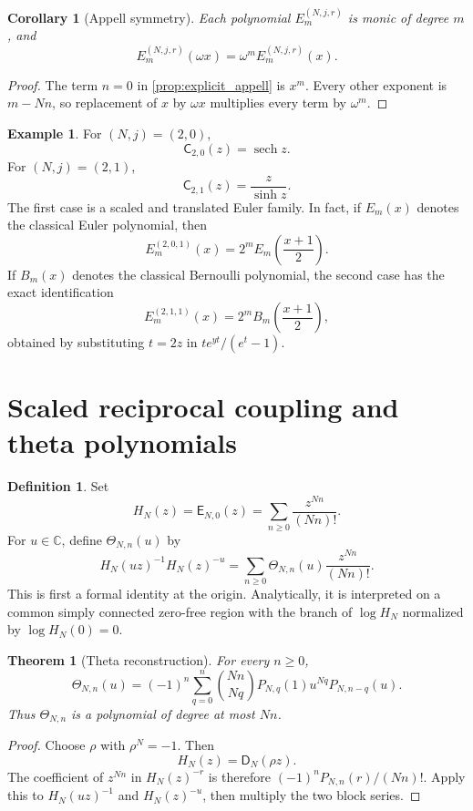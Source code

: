\documentclass[11pt]{article}
\newtheorem{theorem}{Theorem}[section]
\newtheorem{corollary}[corollary]{Corollary}
\theoremstyle{definition}
\newtheorem{definition}[definition]{Definition}
\newtheorem{example}[example]{Example}
\theoremstyle{remark}
\newcommand{\CC}{\mathbb C}
\newcommand{\Dfun}{\mathsf D}
\newcommand{\Efun}{\mathsf E}
\newcommand{\Cfun}{\mathsf C}
\newcommand{\Thetafun}{\mathsf\Theta}
\newcommand{\sech}{\operatorname{sech}}
\begin{document}
\begin{corollary}[Appell symmetry]\label{cor:appell_symmetry}
Each polynomial $E_m^{(N,j,r)}$ is monic of degree $m$, and
\[
E_m^{(N,j,r)}(\omega x)
=
\omega^mE_m^{(N,j,r)}(x).
\]
\end{corollary}

\begin{proof}
The term $n=0$ in \cref{prop:explicit_appell} is $x^m$.  Every other exponent is $m-Nn$, so replacement of $x$ by $\omega x$ multiplies every term by $\omega^m$.
\end{proof}

\begin{example}\label{ex:euler_boundaries}
For $(N,j)=(2,0)$,
\[
\Cfun_{2,0}(z)=\sech z.
\]
For $(N,j)=(2,1)$,
\[
\Cfun_{2,1}(z)=\frac z{\sinh z}.
\]
The first case is a scaled and translated Euler family.  In fact, if $E_m(x)$ denotes the classical Euler polynomial, then
\[
E_m^{(2,0,1)}(x)
=
2^mE_m\left(\frac{x+1}{2}\right).
\]
If $B_m(x)$ denotes the classical Bernoulli polynomial, the second case has
the exact identification
\[
E_m^{(2,1,1)}(x)
=
2^mB_m\left(\frac{x+1}{2}\right),
\]
obtained by substituting $t=2z$ in
$t e^{yt}/(e^t-1)$.
\end{example}

\section{Scaled reciprocal coupling and theta polynomials}\label{sec:theta}

\begin{definition}\label{def:unsigned_denominator}
Set
\[
H_N(z)=\Efun_{N,0}(z)
=
\sum_{n\geq0}\frac{z^{Nn}}{(Nn)!}.
\]
For $u\in\CC$, define $\Thetafun_{N,n}(u)$ by
\[
H_N(uz)^{-1}H_N(z)^{-u}
=
\sum_{n\geq0}\Thetafun_{N,n}(u)\frac{z^{Nn}}{(Nn)!}.
\]
This is first a formal identity at the origin.  Analytically, it is interpreted
on a common simply connected zero-free region with the branch of
$\log H_N$ normalized by $\log H_N(0)=0$.
\end{definition}

\begin{theorem}[Theta reconstruction]\label{thm:theta_reconstruction}
For every $n\geq0$,
\[
\Thetafun_{N,n}(u)
=
(-1)^n
\sum_{q=0}^{n}
\binom{Nn}{Nq}
P_{N,q}(1)u^{Nq}P_{N,n-q}(u).
\]
Thus $\Thetafun_{N,n}$ is a polynomial of degree at most $Nn$.
\end{theorem}

\begin{proof}
Choose $\rho$ with $\rho^N=-1$.  Then
\[
H_N(z)=\Dfun_N(\rho z).
\]
The coefficient of $z^{Nn}$ in $H_N(z)^{-r}$ is therefore $(-1)^nP_{N,n}(r)/(Nn)!$.  Apply this to $H_N(uz)^{-1}$ and $H_N(z)^{-u}$, then multiply the two block series.
\end{proof}
\end{document}
